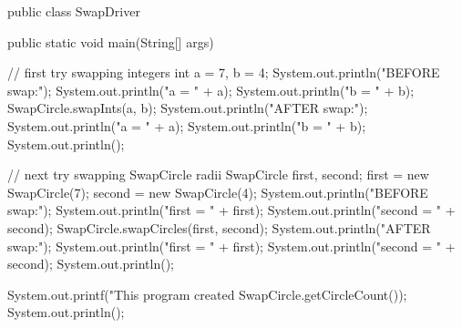\newpage

\begin{javabox}
public class SwapDriver {
    
    public static void main(String[] args) {
        
        // first try swapping integers
        int a = 7, b = 4;
        System.out.println("BEFORE swap:");
        System.out.println("a = " + a);
        System.out.println("b = " + b);
        SwapCircle.swapInts(a, b);
        System.out.println("AFTER swap:");
        System.out.println("a = " + a);
        System.out.println("b = " + b);
        System.out.println();
        
        // next try swapping SwapCircle radii
        SwapCircle first, second;
        first = new SwapCircle(7);
        second = new SwapCircle(4);
        System.out.println("BEFORE swap:");
        System.out.println("first = " + first);
        System.out.println("second = " + second);
        SwapCircle.swapCircles(first, second);
        System.out.println("AFTER swap:");
        System.out.println("first = " + first);
        System.out.println("second = " + second);
        System.out.println();
        
        System.out.printf("This program created %
                          SwapCircle.getCircleCount());
        System.out.println();
    }
}
\end{javabox}
